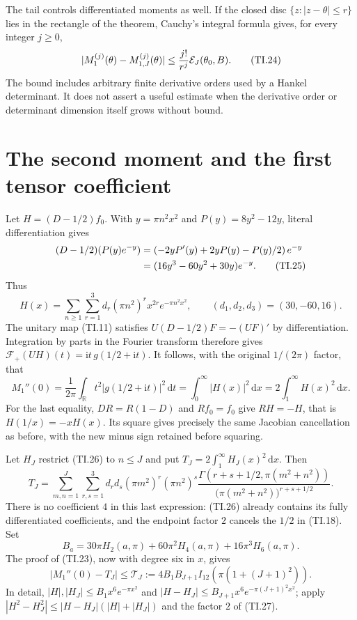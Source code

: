 \documentclass[11pt]{article}
\newcommand{\F}{\mathcal F}
\newcommand{\ii}{\mathrm i}
\newcommand{\dd}{\,\mathrm d}
\begin{document}
The tail controls differentiated moments as well. If the closed disc
$\{z:|z-\theta|\le r\}$ lies in the rectangle of the theorem, Cauchy's
integral formula gives, for every integer $j\ge0$,
\begin{equation}
 |M_1^{(j)}(\theta)-M_{1,J}^{(j)}(\theta)|
 \le \frac{j!}{r^j}{\cal E}_J(\theta_0,B). \tag{TI.24}
\end{equation}
The bound includes arbitrary finite derivative orders used by a Hankel
determinant. It does not assert a useful estimate when the derivative
order or determinant dimension itself grows without bound.

\section{The second moment and the first tensor coefficient}

Let $H=(D-1/2)f_0$. With $y=\pi n^2x^2$ and
$P(y)=8y^2-12y$, literal differentiation gives
\begin{align}
 (D-1/2)(P(y)e^{-y})
 &=\left(-2yP'(y)+2yP(y)-P(y)/2\right)e^{-y}\notag\\
 &=(16y^3-60y^2+30y)e^{-y}. \tag{TI.25}
\end{align}
Thus
\begin{equation}
 H(x)=\sum_{n\ge1}\sum_{r=1}^3d_r(\pi n^2)^r x^{2r}e^{-\pi n^2x^2},
 \qquad(d_1,d_2,d_3)=(30,-60,16). \tag{TI.26}
\end{equation}
The unitary map (TI.11) satisfies
$U(D-1/2)F=-(UF)'$ by differentiation. Integration by parts in the
Fourier transform therefore gives
$\F_+(UH)(t)=\ii t\,g(1/2+\ii t)$. It follows, with the original
$1/(2\pi)$ factor, that
\begin{equation}
 M_1''(0)=\frac1{2\pi}\int_{\mathbb R}t^2|g(1/2+\ii t)|^2\dd t
 =\int_0^\infty |H(x)|^2\dd x=2\int_1^\infty H(x)^2\dd x.
 \tag{TI.27}
\end{equation}
For the last equality, $DR=R(1-D)$ and $Rf_0=f_0$ give
$RH=-H$, that is $H(1/x)=-xH(x)$. Its square gives precisely the
same Jacobian cancellation as before, with the new minus sign retained
before squaring.

Let $H_J$ restrict (TI.26) to $n\le J$ and put
$T_J=2\int_1^\infty H_J(x)^2\dd x$. Then
\begin{equation}
 T_J=\sum_{m,n=1}^J\sum_{r,s=1}^3
 d_rd_s(\pi m^2)^r(\pi n^2)^s
 \frac{\Gamma(r+s+1/2,\pi(m^2+n^2))}
 {\bigl(\pi(m^2+n^2)\bigr)^{r+s+1/2}}. \tag{TI.28}
\end{equation}
There is no coefficient $4$ in this last expression: (TI.26) already
contains its fully differentiated coefficients, and the endpoint
factor $2$ cancels the $1/2$ in (TI.18).
Set
\begin{equation}
 B_a=30\pi H_2(a,\pi)+60\pi^2H_4(a,\pi)+16\pi^3H_6(a,\pi).
 \tag{TI.29}
\end{equation}
The proof of (TI.23), now with degree six in $x$, gives
\begin{equation}
 |M_1''(0)-T_J|
 \le \mathcal T_J:=4B_1B_{J+1}I_{12}(\pi(1+(J+1)^2)). \tag{TI.30}
\end{equation}
In detail, $|H|,|H_J|\le B_1x^6e^{-\pi x^2}$ and
$|H-H_J|\le B_{J+1}x^6e^{-\pi(J+1)^2x^2}$; apply
$|H^2-H_J^2|\le|H-H_J|(|H|+|H_J|)$ and the factor $2$ of (TI.27).
\end{document}
